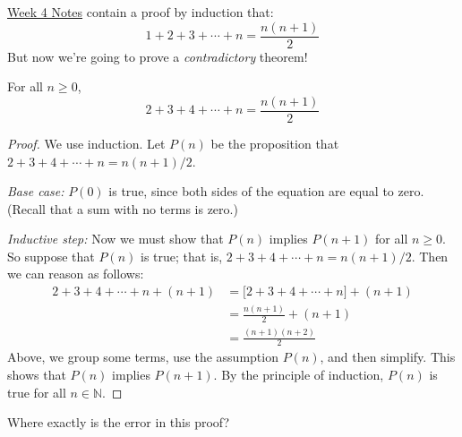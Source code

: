 
\inhandout{
\decideaboutsolutions
\usesimpleproblems
}


\begin{problem}
%
  \href{http://theory.csail.mit.edu/classes/6.042/spring09/ln4.pdf}{Week 4
    Notes} contain a proof by induction that:
%
\[
1 + 2 + 3 + \cdots + n = \frac{n(n+1)}{2}
\]
%
But now we're going to prove a \textit{contradictory} theorem!

\begin{falsethm*}
For all $n \geq 0$,
%
\[
2 + 3 + 4 + \cdots + n = \frac{n(n+1)}{2}
\]
\end{falsethm*}

\begin{proof}
We use induction.  Let $P(n)$ be the proposition that $2 + 3 + 4 +
\cdots + n = n(n+1)/2$.

\noindent \textit{Base case:} $P(0)$ is true, since both sides of the
equation are equal to zero.  (Recall that a sum with no terms is
zero.)

\noindent \textit{Inductive step:} Now we must show that $P(n)$
implies $P(n+1)$ for all $n \geq 0$.  So suppose that $P(n)$ is true;
that is, $2 + 3 + 4 + \cdots + n = n(n+1)/2$.  Then we can reason as
follows:
%
\begin{align*}
2 + 3 + 4 + \cdots + n + (n+1)
    & = \bigl[2 + 3 + 4 + \cdots + n\bigr] + (n+1) \\
    & = \frac{n(n+1)}{2} + (n+1) \\
    & = \frac{(n+1)(n+2)}{2}
\end{align*}
%
Above, we group some terms, use the assumption $P(n)$, and then
simplify.  This shows that $P(n)$ implies $P(n+1)$.  By the principle
of induction, $P(n)$ is true for all $n \in \mathbb{N}$.
\end{proof}

Where exactly is the error in this proof?


\end{problem}
